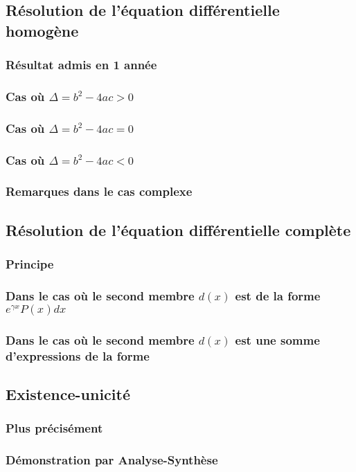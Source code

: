 \documentclass[12pt,a4paper,french]{book}
\begin{document}
		\subsection{Résolution de l'équation différentielle homogène}
			\subsubsection{Résultat admis en 1 année}
			\subsubsection{Cas où $\Delta = b^{2}-4ac > 0$}
			\subsubsection{Cas où $\Delta = b^{2}-4ac = 0$}
			\subsubsection{Cas où $\Delta = b^{2}-4ac < 0$}
			\subsubsection{Remarques dans le cas complexe}
		\subsection{Résolution de l'équation différentielle complète}
			\subsubsection{Principe}
			\subsubsection{Dans le cas où le second membre $d(x)$ est de la forme  $e^{\gamma x}P(x)dx$}
			\subsubsection{Dans le cas où le second membre $d(x)$ est une somme d'expressions de la forme}
		\subsection{Existence-unicité}
			\subsubsection{Plus précisément}
			\subsubsection{Démonstration par Analyse-Synthèse}
			
\end{document}
